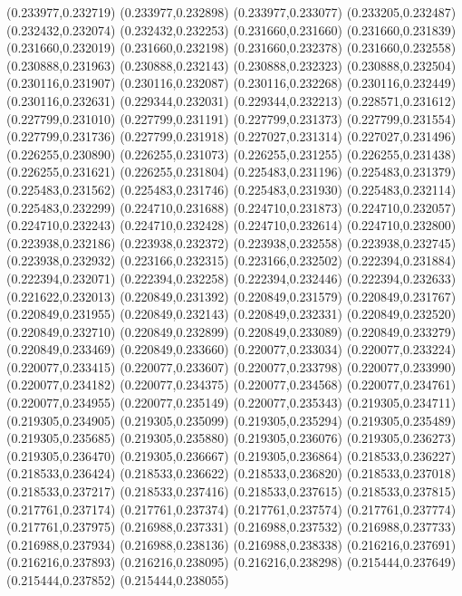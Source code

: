 (0.233977,0.232719)
(0.233977,0.232898)
(0.233977,0.233077)
(0.233205,0.232487)
(0.232432,0.232074)
(0.232432,0.232253)
(0.231660,0.231660)
(0.231660,0.231839)
(0.231660,0.232019)
(0.231660,0.232198)
(0.231660,0.232378)
(0.231660,0.232558)
(0.230888,0.231963)
(0.230888,0.232143)
(0.230888,0.232323)
(0.230888,0.232504)
(0.230116,0.231907)
(0.230116,0.232087)
(0.230116,0.232268)
(0.230116,0.232449)
(0.230116,0.232631)
(0.229344,0.232031)
(0.229344,0.232213)
(0.228571,0.231612)
(0.227799,0.231010)
(0.227799,0.231191)
(0.227799,0.231373)
(0.227799,0.231554)
(0.227799,0.231736)
(0.227799,0.231918)
(0.227027,0.231314)
(0.227027,0.231496)
(0.226255,0.230890)
(0.226255,0.231073)
(0.226255,0.231255)
(0.226255,0.231438)
(0.226255,0.231621)
(0.226255,0.231804)
(0.225483,0.231196)
(0.225483,0.231379)
(0.225483,0.231562)
(0.225483,0.231746)
(0.225483,0.231930)
(0.225483,0.232114)
(0.225483,0.232299)
(0.224710,0.231688)
(0.224710,0.231873)
(0.224710,0.232057)
(0.224710,0.232243)
(0.224710,0.232428)
(0.224710,0.232614)
(0.224710,0.232800)
(0.223938,0.232186)
(0.223938,0.232372)
(0.223938,0.232558)
(0.223938,0.232745)
(0.223938,0.232932)
(0.223166,0.232315)
(0.223166,0.232502)
(0.222394,0.231884)
(0.222394,0.232071)
(0.222394,0.232258)
(0.222394,0.232446)
(0.222394,0.232633)
(0.221622,0.232013)
(0.220849,0.231392)
(0.220849,0.231579)
(0.220849,0.231767)
(0.220849,0.231955)
(0.220849,0.232143)
(0.220849,0.232331)
(0.220849,0.232520)
(0.220849,0.232710)
(0.220849,0.232899)
(0.220849,0.233089)
(0.220849,0.233279)
(0.220849,0.233469)
(0.220849,0.233660)
(0.220077,0.233034)
(0.220077,0.233224)
(0.220077,0.233415)
(0.220077,0.233607)
(0.220077,0.233798)
(0.220077,0.233990)
(0.220077,0.234182)
(0.220077,0.234375)
(0.220077,0.234568)
(0.220077,0.234761)
(0.220077,0.234955)
(0.220077,0.235149)
(0.220077,0.235343)
(0.219305,0.234711)
(0.219305,0.234905)
(0.219305,0.235099)
(0.219305,0.235294)
(0.219305,0.235489)
(0.219305,0.235685)
(0.219305,0.235880)
(0.219305,0.236076)
(0.219305,0.236273)
(0.219305,0.236470)
(0.219305,0.236667)
(0.219305,0.236864)
(0.218533,0.236227)
(0.218533,0.236424)
(0.218533,0.236622)
(0.218533,0.236820)
(0.218533,0.237018)
(0.218533,0.237217)
(0.218533,0.237416)
(0.218533,0.237615)
(0.218533,0.237815)
(0.217761,0.237174)
(0.217761,0.237374)
(0.217761,0.237574)
(0.217761,0.237774)
(0.217761,0.237975)
(0.216988,0.237331)
(0.216988,0.237532)
(0.216988,0.237733)
(0.216988,0.237934)
(0.216988,0.238136)
(0.216988,0.238338)
(0.216216,0.237691)
(0.216216,0.237893)
(0.216216,0.238095)
(0.216216,0.238298)
(0.215444,0.237649)
(0.215444,0.237852)
(0.215444,0.238055)
